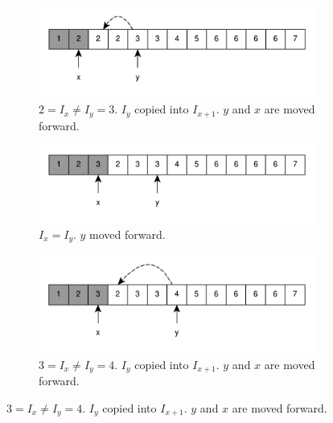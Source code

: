\begin{figure}
\begin{subfigure}[t]{0.49\textwidth}
	 \end{subfigure}
	 \hfill
	 \begin{subfigure}[t]{0.49\textwidth}
		\includegraphics[width=1\linewidth]{sources/remove_duplicated_sorted_array_inplace/images/example1_4}
		\vspace*{-8mm}
		\caption{$2 = I_x \neq I_y = 3$. $I_y$ copied into $I_{x+1}$. $y$ and $x$ are moved forward.}
		\label{fig:remove_duplicated_sorted_array_inplace:example1_4}
	 \end{subfigure}
	 \hfill
	 \begin{subfigure}[t]{0.49\textwidth}
		\includegraphics[width=1\linewidth]{sources/remove_duplicated_sorted_array_inplace/images/example1_5}
		\vspace*{-8mm}
		\caption{$I_x = I_y$. $y$ moved forward.}
		\label{fig:remove_duplicated_sorted_array_inplace:example1_5}
	 \end{subfigure}
	 \hfill
	 \begin{subfigure}[t]{0.49\textwidth}
		\includegraphics[width=1\linewidth]{sources/remove_duplicated_sorted_array_inplace/images/example1_7}
		\vspace*{-8mm}
		\caption{$3 = I_x \neq I_y = 4$. $I_y$ copied into $I_{x+1}$. $y$ and $x$ are moved forward.}

\end{subfigure}
\end{figure}
